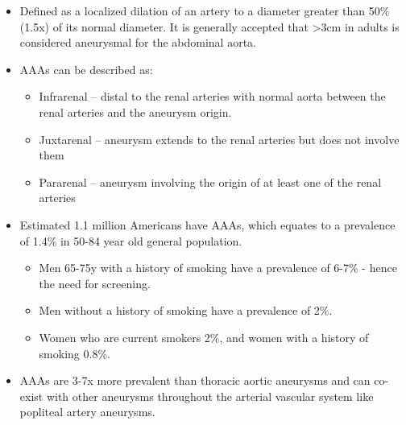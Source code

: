 \documentclass[
]{book}
\begin{document}
\begin{itemize}
\item
  Defined as a localized dilation of an artery to a diameter greater
  than 50\% (1.5x) of its normal diameter. It is generally accepted
  that \textgreater3cm in adults is considered aneurysmal for the abdominal
  aorta.
\item
  AAAs can be described as:

  \begin{itemize}
  \item
    Infrarenal -- distal to the renal arteries with normal aorta
    between the renal arteries and the aneurysm origin.
  \item
    Juxtarenal -- aneurysm extends to the renal arteries but does
    not involve them
  \item
    Pararenal -- aneurysm involving the origin of at least one of
    the renal arteries
  \end{itemize}
\item
  Estimated 1.1 million Americans have AAAs, which equates to a
  prevalence of 1.4\% in 50-84 year old general population.

  \begin{itemize}
  \item
    Men 65-75y with a history of smoking have a prevalence of 6-7\% -
    hence the need for screening.\citep{lefevre2014, chaikof2018}
  \item
    Men without a history of smoking have a prevalence of 2\%.
  \item
    Women who are current smokers 2\%, and women with a history of
    smoking 0.8\%.\citep{wanhainen2006}
  \end{itemize}
\item
  AAAs are 3-7x more prevalent than thoracic aortic aneurysms and can
  co-exist with other aneurysms throughout the arterial vascular
  system like popliteal artery aneurysms.


\end{itemize}
\end{document}

